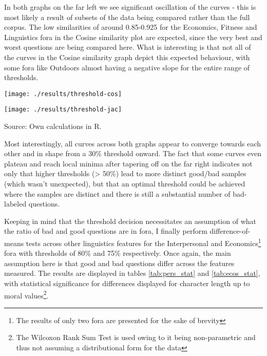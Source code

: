 \documentclass[12pt,preprint, authoryear]{article}
\let\origfigure\figure
\let\endorigfigure\endfigure
\renewenvironment{figure}[1][2] {
    \expandafter\origfigure\expandafter[H]
} {
    \endorigfigure
}
\numberwithin{equation}{section}
\numberwithin{figure}{section}
\numberwithin{table}{section}
\let\rmarkdownfootnote\footnote%
\def\footnote{\protect\rmarkdownfootnote}
\begin{document}
In both graphs on the far left we see significant oscillation of the
curves - this is most likely a result of subsets of the data being
compared rather than the full corpus. The low similarities of around
0.85-0.925 for the Economics, Fitness and Linguistics fora in the Cosine
similarity plot are expected, since the very best and worst questions
are being compared here. What is interesting is that not all of the
curves in the Cosine similarity graph depict this expected behaviour,
with some fora like Outdoors almost having a negative slope for the
entire range of thresholds.

\setcounter{figure}{2}

\begin{figure}
\caption{\textbf{Comparing Feature Use Across Good and Bad Questions}}
\label{fig:simil}

\begin{center}\texttt{[image: ./results/threshold-cos]} \end{center}



\begin{center}\texttt{[image: ./results/threshold-jac]} \end{center}
\centering
{\footnotesize Source: Own calculations in R.}
\end{figure}

\normalsize

Most interestingly, all curves across both graphs appear to converge
towards each other and in shape from a 30\% threshold onward. The fact
that some curves even plateau and reach local minima after tapering off
on the far right indicates not only that higher thresholds
(\textgreater{} 50\%) lead to more distinct good/bad samples (which
wasn't unexpected), but that an optimal threshold could be achieved
where the samples are distinct and there is still a substantial number
of bad-labeled questions.

Keeping in mind that the threshold decision necessitates an assumption
of what the ratio of bad and good questions are in fora, I finally
perform difference-of-means tests across other linguistics features for
the Interpersonal and
Economics\footnote{The results of only two fora are presented for the sake of brevity}
fora with thresholds of 80\% and 75\% respectively. Once again, the main
assumption here is that good and bad questions differ across the
features measured. The results are displayed in tables
\ref{tab:pers_stat} and \ref{tab:ecos_stat}, with statistical
significance for differences displayed for character length up to moral
values\footnote{The Wilcoxon Rank Sum Test is used owing to it being non-parametric and thus not assuming a distributional form for the data}.
\newline
\end{document}
